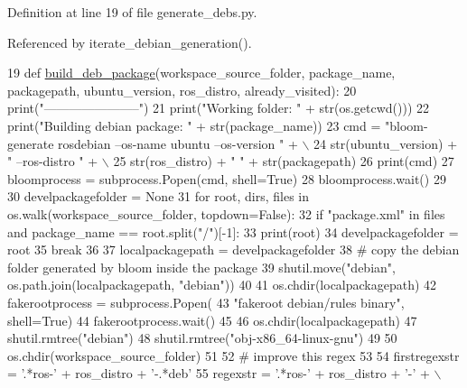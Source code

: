 Definition at line 19 of file generate\+\_\+debs.\+py.



Referenced by iterate\+\_\+debian\+\_\+generation().


\begin{DoxyCode}
19 \textcolor{keyword}{def }\hyperlink{namespacegenerate__debs_aa70c3f4917ddc57b13eaed8501f571a8}{build\_deb\_package}(workspace\_source\_folder, package\_name, packagepath, ubuntu\_version, 
      ros\_distro, already\_visited):
20     print(\textcolor{stringliteral}{"-----------------------"})
21     print(\textcolor{stringliteral}{"Working folder: "} + str(os.getcwd()))
22     print(\textcolor{stringliteral}{"Building debian package: "} + str(package\_name))
23     cmd = \textcolor{stringliteral}{"bloom-generate rosdebian --os-name ubuntu --os-version "} + \(\backslash\)
24         str(ubuntu\_version) + \textcolor{stringliteral}{" --ros-distro "} + \(\backslash\)
25         str(ros\_distro) + \textcolor{stringliteral}{" "} + str(packagepath)
26     print(cmd)
27     bloomprocess = subprocess.Popen(cmd, shell=\textcolor{keyword}{True})
28     bloomprocess.wait()
29 
30     develpackagefolder = \textcolor{keywordtype}{None}
31     \textcolor{keywordflow}{for} root, dirs, files \textcolor{keywordflow}{in} os.walk(workspace\_source\_folder, topdown=\textcolor{keyword}{False}):
32         \textcolor{keywordflow}{if} \textcolor{stringliteral}{"package.xml"} \textcolor{keywordflow}{in} files \textcolor{keywordflow}{and} package\_name == root.split(\textcolor{stringliteral}{"/"})[-1]:
33             print(root)
34             develpackagefolder = root
35             \textcolor{keywordflow}{break}
36 
37     localpackagepath = develpackagefolder
38     \textcolor{comment}{# copy the debian folder generated by bloom inside the package}
39     shutil.move(\textcolor{stringliteral}{"debian"}, os.path.join(localpackagepath, \textcolor{stringliteral}{"debian"}))
40 
41     os.chdir(localpackagepath)
42     fakerootprocess = subprocess.Popen(
43         \textcolor{stringliteral}{"fakeroot debian/rules binary"}, shell=\textcolor{keyword}{True})
44     fakerootprocess.wait()
45 
46     os.chdir(localpackagepath)
47     shutil.rmtree(\textcolor{stringliteral}{"debian"})
48     shutil.rmtree(\textcolor{stringliteral}{"obj-x86\_64-linux-gnu"})
49 
50     os.chdir(workspace\_source\_folder)
51 
52     \textcolor{comment}{# improve this regex}
53 
54     firstregexstr = \textcolor{stringliteral}{'.*ros-'} + ros\_distro + \textcolor{stringliteral}{'-.*deb'}
55     regexstr = \textcolor{stringliteral}{'.*ros-'} + ros\_distro + \textcolor{stringliteral}{'-'} + \(\backslash\)

\end{DoxyCode}
